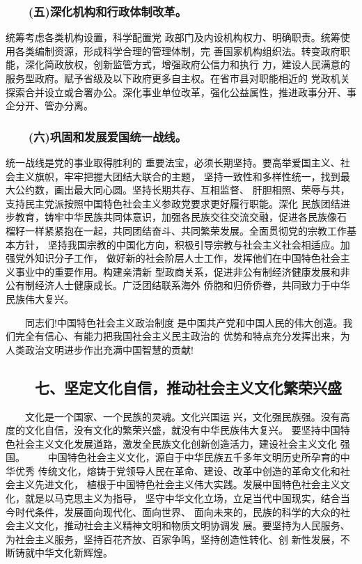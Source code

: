 \documentclass[11pt]{ctexart}
\begin{document}
{{{{\subsubsection{　　(五)深化机构和行政体制改革。}
\label{sec:orgbbb9ef3}

统筹考虑各类机构设置，科学配置党
政部门及内设机构权力、明确职责。统筹使用各类编制资源，形成科学合理的管理体制，完
善国家机构组织法。转变政府职能，深化简政放权，创新监管方式，增强政府公信力和执行
力，建设人民满意的服务型政府。赋予省级及以下政府更多自主权。在省市县对职能相近的
党政机关探索合并设立或合署办公。深化事业单位改革，强化公益属性，推进政事分开、事
企分开、管办分离。

\subsubsection{　　(六)巩固和发展爱国统一战线。}
\label{sec:orgc0dc6e9}

统一战线是党的事业取得胜利的
重要法宝，必须长期坚持。要高举爱国主义、社会主义旗帜，牢牢把握大团结大联合的主题，
坚持一致性和多样性统一，找到最大公约数，画出最大同心圆。坚持长期共存、互相监督、
肝胆相照、荣辱与共，支持民主党派按照中国特色社会主义参政党要求更好履行职能。深化
民族团结进步教育，铸牢中华民族共同体意识，加强各民族交往交流交融，促进各民族像石
榴籽一样紧紧抱在一起，共同团结奋斗、共同繁荣发展。全面贯彻党的宗教工作基本方针，
坚持我国宗教的中国化方向，积极引导宗教与社会主义社会相适应。加强党外知识分子工作，
做好新的社会阶层人士工作，发挥他们在中国特色社会主义事业中的重要作用。构建亲清新
型政商关系，促进非公有制经济健康发展和非公有制经济人士健康成长。广泛团结联系海外
侨胞和归侨侨眷，共同致力于中华民族伟大复兴。

　　同志们!中国特色社会主义政治制度
是中国共产党和中国人民的伟大创造。我们完全有信心、有能力把我国社会主义民主政治的
优势和特点充分发挥出来，为人类政治文明进步作出充满中国智慧的贡献!

\subsection{　　七、坚定文化自信，推动社会主义文化繁荣兴盛}
\label{sec:orgaa1ab2b}

　　文化是一个国家、一个民族的灵魂。文化兴国运
兴，文化强民族强。没有高度的文化自信，没有文化的繁荣兴盛，就没有中华民族伟大复兴。
要坚持中国特色社会主义文化发展道路，激发全民族文化创新创造活力，建设社会主义文化
强国。
　　中国特色社会主义文化，源自于中华民族五千多年文明历史所孕育的中华优秀
传统文化，熔铸于党领导人民在革命、建设、改革中创造的革命文化和社会主义先进文化，
植根于中国特色社会主义伟大实践。发展中国特色社会主义文化，就是以马克思主义为指导，
坚守中华文化立场，立足当代中国现实，结合当今时代条件，发展面向现代化、面向世界、
面向未来的，民族的科学的大众的社会主义文化，推动社会主义精神文明和物质文明协调发
展。要坚持为人民服务、为社会主义服务，坚持百花齐放、百家争鸣，坚持创造性转化、创
新性发展，不断铸就中华文化新辉煌。

}}}}
\end{document}
